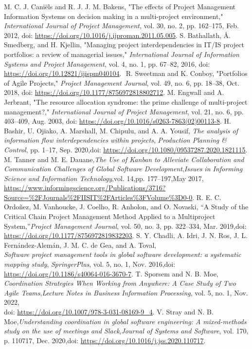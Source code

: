 \documentclass{llncs}
\begin{document}
\begin{thebibliography}{10}
  M. C. J. Caniëls and R. J. J. M. Bakens, "The effects of Project Management Information Systems on decision making in a multi-project environment," \textit{International Journal of Project Management}, vol. 30, no. 2, pp. 162–175, Feb. 2012, doi: \url{https://doi.org/10.1016/j.ijproman.2011.05.005}.
  S. Bathallath, Å. Smedberg, and H. Kjellin, "Managing project interdependencies in IT/IS project portfolios: a review of managerial issues," \textit{International Journal of Information Systems and Project Management}, vol. 4, no. 1, pp. 67–82, 2016, doi: \url{https://doi.org/10.12821/ijispm040104}.
‌
  R. Sweetman and K. Conboy, "Portfolios of Agile Projects," \textit{Project Management Journal}, vol. 49, no. 6, pp. 18–38, Oct. 2018, doi: \url{https://doi.org/10.1177/8756972818802712}.
 M. Engwall and A. Jerbrant, "The resource allocation syndrome: the prime challenge of multi-project management?," \textit{International Journal of Project Management}, vol. 21, no. 6, pp. 403–409, Aug. 2003, doi: \url{https://doi.org/10.1016/s0263-7863(02)00113-8}.
H. Bashir, U. Ojiako, A. Marshall, M. Chipulu, and A. A. Yousif,
\textit{The analysis of information flow interdependencies within projects},
\textit{Production Planning \& Control}, pp. 1–17, Sep. 2020,doi: \url{https://doi.org/10.1080/09537287.2020.1821115}.
 M. Tanner and M. E. Dauane,\textit{The Use of Kanban to Alleviate Collaboration and Communication Challenges of Global Software Development},\textit{Issues in Informing Science and Information Technology},vol. 14,pp. 177–197,May 2017,
\url{https://www.informingscience.org/Publications/3716?Source=%2FJournals%2FIISIT%2FArticles%3FVolume%3D0-0}.
R. E. C. Ordoñez, M. Vanhoucke, J. Coelho, R. Anholon, and O. Novaski,
``A Study of the Critical Chain Project Management Method Applied to a Multiproject System,''\emph{Project Management Journal}, vol. 50, no. 3, pp. 322–334, Mar. 2019,doi: \url{https://doi.org/10.1177/8756972819832203}.
S. Y. Chadli, A. Idri, J. N. Ros, J. L. Fernández-Alemán, J. M. C. de Gea, and A. Toval, \\ \emph{Software project management tools in global software development: a systematic mapping study}, \emph{SpringerPlus}, vol. 5, no. 1, Nov. 2016,doi: \url{https://doi.org/10.1186/s40064-016-3670-7}.
T. Sporsem and N. B. Moe, \emph{Coordination Strategies When Working from Anywhere: A Case Study of Two Agile Teams},\emph{Lecture Notes in Business Information Processing}, vol. 5, no. 1, Nov. 2022, \\
doi: \url{https://doi.org/10.1007/978-3-031-08169-9_4}.
V. Stray and N. B. Moe,\emph{Understanding coordination in global software engineering: A mixed-methods study on the use of meetings and Slack},\emph{Journal of Systems and Software}, vol. 170, p. 110717, Dec. 2020,doi: \url{https://doi.org/10.1016/j.jss.2020.110717}.‌
‌
‌
\end{thebibliography}
\end{document}

